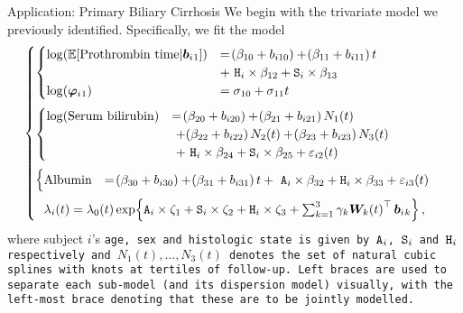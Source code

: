 \begin{chapter}{\label{cha:app-PBC}Application: Primary Biliary Cirrhosis}
  We begin with the trivariate model we previously identified. Specifically, we fit the model
  \begin{equation}
    \begin{aligned}
    \begin{cases}
        \begin{cases}
           \log\lb\Exp\ls\mathrm{Prothrombin\ time}|\b{_1}\rs\rb&=\lb\beta_{10}+b_{i10}\rb + \lb\beta_{11}+b_{i11}\rb t \\&+\ \tt{H}_i\times\beta_{12} + \tt{S}_i\times\beta_{13}\\ 
           \log\lb\bphi{_1}\rb&=\sigma_{10} + \sigma_{11}t\\ 
        \end{cases}
        \\\noalign{\vspace*{2mm}}
        \begin{cases}
            \log\lb\mathrm{Serum\ bilirubin}\rb &= \lb\beta_{20} + b_{i20}\rb + \lb\beta_{21} + b_{i21}\rb N_1(t) \\&\ + \lb\beta_{22} + b_{i22}\rb N_2(t) + \lb\beta_{23} + b_{i23}\rb N_3(t)\\&\ +\ \tt{H}_i\times\beta_{24} + \tt{S}_i\times\beta_{25} + \varepsilon_{i2}\lb t\rb
        \end{cases}
        \\\noalign{\vspace*{2mm}}
        \begin{cases}
            \mathrm{Albumin} &= \lb\beta_{30} + b_{i30}\rb + \lb\beta_{31} + b_{i31}\rb t +\ \tt{A}_i\times\beta_{32} + \tt{H}_i\times\beta_{33} + \varepsilon_{i3}\lb t\rb
        \end{cases}
        \\\noalign{\vspace*{2mm}}
        \ \ \li\lb t\rb = \lo\lb t\rb \exp\lbr\tt{A}_i\times\zeta_1+\tt{S}_i\times\zeta_2+\tt{H}_i\times\zeta_3+\sum_{k=1}^3\gamma_k\bm{W}_k\lb t\rb^\top\b{_k}\rbr,
    \end{cases}       
    \end{aligned}
    \label{eq:pbc-trivariate}
  \end{equation}
  where subject $i$'s \tt{age}, \tt{sex} and \tt{histologic} state is given by $\tt{A}_i$, $\tt{S}_i$ and $\tt{H}_i$ respectively and $N_1(t),\dots,N_3(t)$ denotes the set of natural cubic splines with knots at tertiles of follow-up. Left braces are used to separate each sub-model (and its dispersion model) visually, with the left-most brace denoting that these are to be jointly modelled.


\end{chapter}
